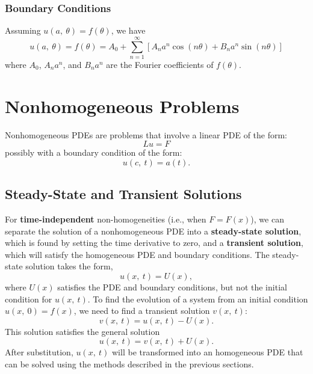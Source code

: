 \documentclass{article}
\begin{document}
\subsubsection{Boundary Conditions}
Assuming \(u\left( a,\: \theta \right) = f\left( \theta \right)\), we
have
\begin{equation*}
    u\left( a,\: \theta \right) = f\left( \theta \right) = A_0 + \sum_{n = 1}^\infty \left[ A_n a^n \cos{\left( n \theta \right)} + B_n a^n \sin{\left( n \theta \right)} \right]
\end{equation*}
where \(A_0\), \(A_n a^n\), and \(B_n a^n\) are the Fourier coefficients of \(f\left( \theta \right)\).
\section{Nonhomogeneous Problems}
Nonhomogeneous PDEs are problems that involve a linear PDE of the form:
\begin{equation*}
    L u = F
\end{equation*}
possibly with a boundary condition of the form:
\begin{equation*}
    u\left( c,\: t \right) = a\left( t \right).
\end{equation*}
\subsection{Steady-State and Transient Solutions}
For \textbf{time-independent} non-homogeneities (i.e., when \(F =
F\left( x \right)\)), we can separate the solution of a nonhomogeneous
PDE into a \textbf{steady-state solution}, which is found by setting
the time derivative to zero, and a \textbf{transient solution}, which
will satisfy the homogeneous PDE and boundary conditions. The
steady-state solution takes the form,
\begin{equation*}
    u\left( x,\: t \right) = U\left( x \right),
\end{equation*}
where \(U\left( x \right)\) satisfies the PDE and boundary conditions, but not the initial condition for \(u\left( x,\: t \right)\).
To find the evolution of a system from an initial condition \(u\left(
x,\: 0 \right) = f\left( x \right)\), we need to find a transient
solution \(v\left( x,\: t \right)\):
\begin{equation*}
    v\left( x,\: t \right) = u\left( x,\: t \right) - U\left( x \right).
\end{equation*}
This solution satisfies the general solution
\begin{equation*}
    u\left( x,\: t \right) = v\left( x,\: t \right) + U\left( x \right).
\end{equation*}
After substitution, \(u\left( x,\: t \right)\) will be transformed into an homogeneous PDE that
can be solved using the methods described in the previous sections.
\end{document}
